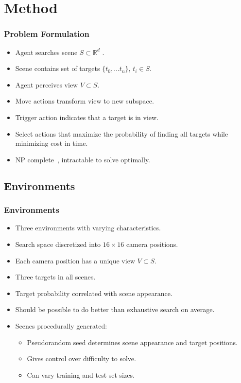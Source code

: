 \section{Method}

\begin{frame}
    \frametitle{Problem Formulation}

    \begin{itemize}
        \item Agent searches scene \(S \subset \mathbb{R}^d\) .
        \item Scene contains set of targets \(\{t_0, \dots t_n\}\), \(t_i \in S\).
        \item Agent perceives view \(V \subset S\).
        \item Move actions transform view to new subspace.
        \item Trigger action indicates that a target is in view.
        \item Select actions that maximize the probability of finding all targets while minimizing cost in time.
        \item NP complete~\cite{ye_tsotsos_2001}, intractable to solve optimally.
    \end{itemize}
\end{frame}

\subsection{Environments}

\begin{frame}
    \frametitle{Environments}
    
    \begin{itemize}
        \item Three environments with varying characteristics.
        \item Search space discretized into \(16 \times 16\) camera positions.
        \item Each camera position has a unique view \(V \subset S\).
        \item Three targets in all scenes.
        \item Target probability correlated with scene appearance.
        \item Should be possible to do better than exhaustive search on average.
        \item Scenes procedurally generated:
        \begin{itemize}
            \item Pseudorandom seed determines scene appearance and target positions.
            \item Gives control over difficulty to solve.
            \item Can vary training and test set sizes.
        \end{itemize}
    \end{itemize}
\end{frame}

